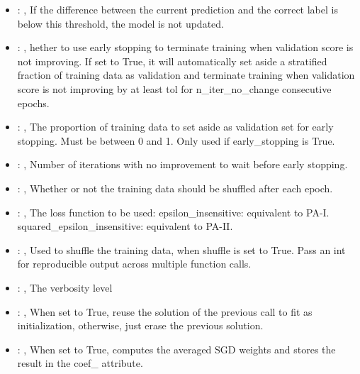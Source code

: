 \begin{itemize}
    \item {}: , 
      If the difference between the current prediction and the
      correct label is below this threshold, the model is not updated.

    \item {}: , 
      hether to use early stopping to terminate training when validation score is not
      improving. If set to True, it will automatically set aside a stratified fraction of training
      data as validation and terminate training when validation score is not improving by at least
      tol for n\_iter\_no\_change consecutive epochs.

    \item {}: , 
      The proportion of training data to set aside as validation set for early stopping.
      Must be between 0 and 1. Only used if early\_stopping is True.

    \item {}: , 
      Number of iterations with no improvement to wait before early stopping.

    \item {}: , 
      Whether or not the training data should be shuffled after each epoch.

    \item {}: , 
      The loss function to be used: epsilon\_insensitive: equivalent to PA-I.
      squared\_epsilon\_insensitive: equivalent to PA-II.

    \item {}: , 
      Used to shuffle the training data, when shuffle is set to
      True. Pass an int for reproducible output across multiple function calls.

    \item {}: , 
      The verbosity level

    \item {}: , 
      When set to True, reuse the solution of the previous call
      to fit as initialization, otherwise, just erase the previous solution.

    \item {}: , 
      When set to True, computes the averaged SGD weights and
      stores the result in the coef\_ attribute.
  \end{itemize}


